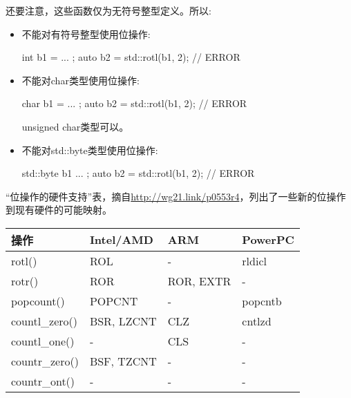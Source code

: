 还要注意，这些函数仅为无符号整型定义。所以:

\begin{itemize}
\item 
不能对有符号整型使用位操作:

\begin{cpp}
int b1 = ... ;
auto b2 = std::rotl(b1, 2); // ERROR
\end{cpp}

\item
不能对char类型使用位操作:

\begin{cpp}
char b1 = ... ;
auto b2 = std::rotl(b1, 2); // ERROR
\end{cpp}

unsigned char类型可以。

\item
不能对std::byte类型使用位操作:

\begin{cpp}
std::byte b1{ ... };
auto b2 = std::rotl(b1, 2); // ERROR
\end{cpp}

\end{itemize}

“位操作的硬件支持”表，摘自\url{http://wg21.link/p0553r4}，列出了一些新的位操作到现有硬件的可能映射。


\begin{longtable}[c]{|l|l|l|l|}
\hline
\textbf{操作} & \textbf{Intel/AMD} & \textbf{ARM} & \textbf{PowerPC} \\ \hline
\endfirsthead
%
\endhead
%
rotl()             & ROL                & -            & rldicl           \\ \hline
rotr()             & ROR                & ROR, EXTR    & -                \\ \hline
popcount()         & POPCNT             & -            & popcntb          \\ \hline
countl\_zero()     & BSR, LZCNT         & CLZ          & cntlzd           \\ \hline
countl\_one()      & -                  & CLS          & -                \\ \hline
countr\_zero()     & BSF, TZCNT         & -            & -                \\ \hline
countr\_ont()      & -                  & -            & -                \\ \hline
\end{longtable}


